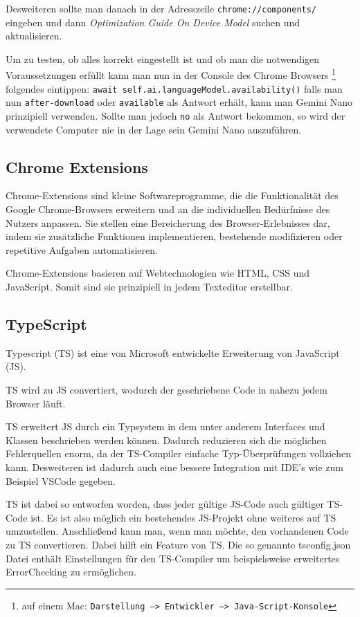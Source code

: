 Desweiteren sollte man danach in der Adresszeile \texttt{chrome://components/} eingeben und dann \emph{Optimization Guide On Device Model} suchen und aktualisieren.

Um zu testen, ob alles korrekt eingestellt ist und ob man die notwendigen Voraussetzungen erfüllt kann man nun in der Console  des Chrome Browsers \footnote{auf einem Mac: \texttt{Darstellung --> Entwickler --> Java-Script-Konsole}} folgendes eintippen: \texttt{await self.ai.languageModel.availability()} falls man nun \texttt{after-download} oder \texttt{available} als Antwort erhält, kann man Gemini Nano prinzipiell verwenden. Sollte man jedoch \texttt{no} als Antwort bekommen, so wird der verwendete Computer nie in der Lage sein Gemini Nano auszuführen.

\subsection{Chrome Extensions}

Chrome-Extensions \cite{chrome-extensions} sind kleine Softwareprogramme, die die Funktionalität des Google Chrome-Browsers erweitern und an die individuellen Bedürfnisse des Nutzers anpassen. Sie stellen eine Bereicherung des Browser-Erlebnisses dar, indem sie zusätzliche Funktionen implementieren, bestehende modifizieren oder repetitive Aufgaben automatisieren.

Chrome-Extensions basieren auf Webtechnologien wie HTML, CSS und JavaScript. Somit sind sie prinzipiell in jedem Texteditor erstellbar.

\subsection{TypeScript}

Typescript (TS) ist eine von Microsoft entwickelte Erweiterung von JavaScript (JS). \cite{typescript}

TS wird zu JS convertiert, wodurch der geschriebene Code in nahezu jedem Browser läuft. \cite{typescript}

TS erweitert JS durch ein Typsystem in dem unter anderem Interfaces und Klassen beschrieben werden können. Dadurch reduzieren sich die möglichen Fehlerquellen enorm, da der TS-Compiler einfache Typ-Überprüfungen vollziehen kann. Desweiteren ist dadurch auch eine bessere Integration mit IDE's wie zum Beispiel VSCode gegeben. \cite{typescript}

TS ist dabei so entworfen worden, dass jeder gültige JS-Code auch gültiger TS-Code ist. Es ist also möglich ein bestehendes JS-Projekt ohne weiteres auf TS umzustellen. Anschließend kann man, wenn man möchte, den vorhandenen Code zu TS convertieren. \cite{typescript} \cite{ts-doku} Dabei hilft ein Feature von TS. Die so genannte tsconfig.json Datei enthält Einstellungen für den TS-Compiler um beispielsweise erweitertes ErrorChecking zu ermöglichen. \cite{tsconfig}

